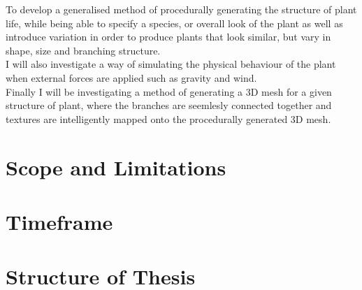 \begin{flushleft}

To develop a generalised method of procedurally generating the structure of plant life, while being able to specify a species, or overall look of the plant as well as introduce variation in order to produce plants that look similar, but vary in shape, size and branching structure. \\
I will also investigate a way of simulating the physical behaviour of the plant when external forces are applied such as gravity and wind. \\
Finally I will be investigating a method of generating a 3D mesh for a given structure of plant, where the branches are seemlesly connected together and textures are intelligently mapped onto the procedurally generated 3D mesh.\\ 
\end{flushleft} 


\section{Scope and Limitations}

\section{Timeframe}



\section{Structure of Thesis}


